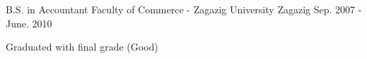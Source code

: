 

\begin{cventries}

  \cventry
    {B.S. in Accountant} %
    {Faculty of Commerce - Zagazig University} %
    {Zagazig} %
    {Sep. 2007 - June. 2010} %
    {
      \begin{cvitems} %
        \item {Graduated with final grade (Good)}
      \end{cvitems}
    }

\end{cventries}
